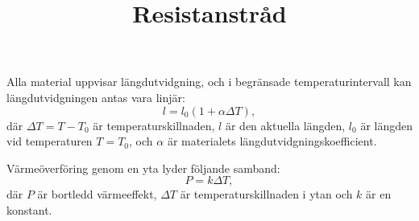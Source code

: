 \documentclass[12pt,a4paper]{article}
\begin{document}
\title{Resistanstråd}
\author{}
\date{}%
\maketitle


Alla material uppvisar längdutvidgning, och i begränsade
temperaturintervall kan längdutvidgningen antas vara linjär:
\[l=l_0(1+\alpha\Delta T), \]
där $\Delta T = T-T_0$ är temperaturskillnaden, $l$ är den aktuella
längden, $l_0$ är längden vid temperaturen $T=T_0$, och $\alpha$ är
materialets längdutvidgningskoefficient.

Värmeöverföring genom en yta lyder följande samband:
\[ P = k \Delta T, \]
där $P$ är bortledd värmeeffekt,
$\Delta T$ är temperaturskillnaden i ytan och $k$ är en konstant.
\end{document}

